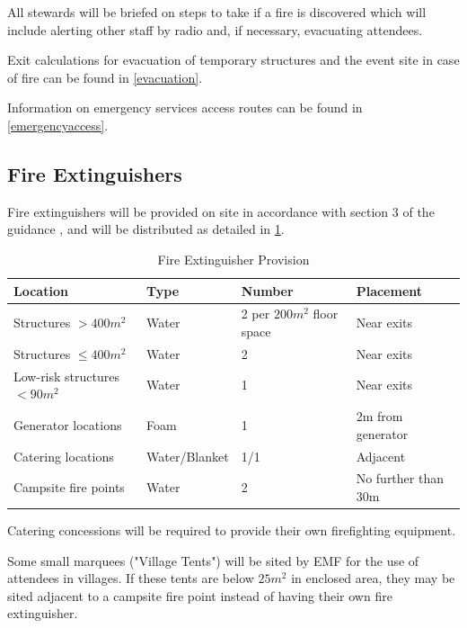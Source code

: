 All stewards will be briefed on steps to take if a fire is discovered which
will include alerting other staff by radio and, if necessary, evacuating
attendees.

Exit calculations for evacuation of temporary structures and the event site in case of
fire can be found in \cref{evacuation}.

Information on emergency services access routes can be found in \cref{emergencyaccess}.

\subsection{Fire Extinguishers}

Fire extinguishers will be provided on site in accordance with section 3 of the
guidance \cite{firesafety}, and will be distributed as detailed in \cref{table:fireex}.

\begin{table}[h!]
\caption{Fire Extinguisher Provision}
\label{table:fireex}
\centering
\begin{tabular}{| l | l | l | l |}
\hline
    \textbf{Location}            & \textbf{Type} & \textbf{Number} & \textbf{Placement} \\
    \hline
    Structures $>400m^2$         & Water         & 2 per $200m^2$ floor space & Near exits \\
    Structures $\leq400m^2$      & Water         & 2                          & Near exits \\
    Low-risk structures $<90m^2$ & Water         & 1                          & Near exits \\
    Generator locations          & Foam          & 1                          & 2m from generator \\
    Catering locations           & Water/Blanket & 1/1                        & Adjacent \\
    Campsite fire points         & Water         & 2                          & No further than 30m \\
\hline
\end{tabular}
\end{table}

Catering concessions will be required to provide their own firefighting equipment.

Some small marquees ("Village Tents") will be sited by EMF for the use of attendees in villages.
If these tents are below $25m^2$ in enclosed area, they may be sited adjacent to a campsite fire point
instead of having their own fire extinguisher.

